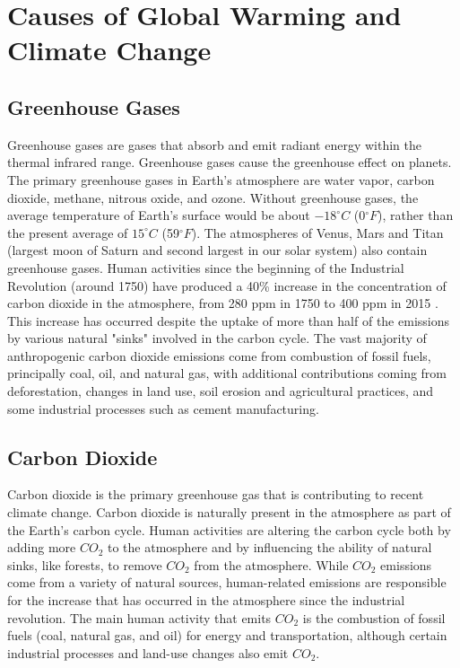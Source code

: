 \documentclass{article}
\begin{document}
\section{Causes of Global Warming and Climate Change}

\subsection{Greenhouse Gases}
Greenhouse gases are gases that absorb and emit radiant energy within the
thermal infrared range. Greenhouse gases cause the greenhouse effect on
planets. The primary greenhouse gases in Earth's atmosphere are water vapor,
carbon dioxide, methane, nitrous oxide, and ozone. Without greenhouse gases,
the average temperature of Earth's surface would be about $-18^{\circ}C$
(0$^{\circ}F$), rather than the present average of $15^{\circ}C$
(59$^{\circ}F$). The atmospheres of Venus, Mars and Titan (largest moon of
Saturn and second largest in our solar system) also contain greenhouse gases.
Human activities since the beginning of the Industrial Revolution (around 1750)
have produced a 40\% increase in the concentration of carbon dioxide in the
atmosphere, from 280 ppm in 1750 to 400 ppm in 2015 \cite{US_EPA}. This increase has
occurred despite the uptake of more than half of the emissions by various
natural "sinks" involved in the carbon cycle. The vast majority of
anthropogenic carbon dioxide emissions come from combustion of fossil fuels,
principally coal, oil, and natural gas, with additional contributions coming
from deforestation, changes in land use, soil erosion and agricultural
practices, and some industrial processes such as cement manufacturing.

\subsection{Carbon Dioxide}
Carbon dioxide is the primary greenhouse gas that is contributing to recent
climate change. Carbon dioxide is naturally present in the atmosphere as part
of the Earth's carbon cycle. Human activities are altering the carbon cycle
both by adding more $CO_2$ to the atmosphere and by influencing the ability of
natural sinks, like forests, to remove $CO_2$ from the atmosphere. While $CO_2$
emissions come from a variety of natural sources, human-related emissions are
responsible for the increase that has occurred in the atmosphere since the
industrial revolution. The main human activity that emits $CO_2$ is the combustion
of fossil fuels (coal, natural gas, and oil) for energy and transportation,
although certain industrial processes and land-use changes also emit $CO_2$.
\end{document}
